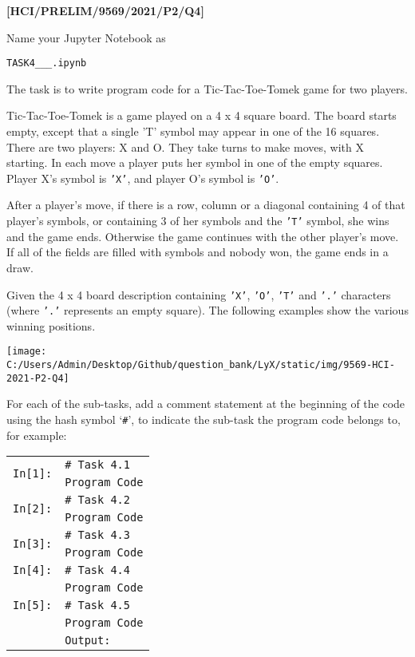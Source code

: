 \item \textbf{{[}HCI/PRELIM/9569/2021/P2/Q4{]}}

Name your Jupyter Notebook as 

\texttt{TASK4\_<your name>\_<centre number>\_<index number>.ipynb }

The task is to write program code for a Tic-Tac-Toe-Tomek game for
two players. 

Tic-Tac-Toe-Tomek is a game played on a 4 x 4 square board. The board
starts empty, except that a single 'T' symbol may appear in one of
the 16 squares. There are two players: X and O. They take turns to
make moves, with X starting. In each move a player puts her symbol
in one of the empty squares. Player X's symbol is \texttt{'X'}, and
player O's symbol is \texttt{'O'}. 

After a player's move, if there is a row, column or a diagonal containing
4 of that player's symbols, or containing 3 of her symbols and the
\texttt{'T'} symbol, she wins and the game ends. Otherwise the game
continues with the other player's move. If all of the fields are filled
with symbols and nobody won, the game ends in a draw. 

Given the 4 x 4 board description containing \texttt{'X'}, \texttt{'O'},
\texttt{'T'} and \texttt{'.'} characters (where \texttt{'.'} represents
an empty square). The following examples show the various winning
positions. 
\begin{center}
\texttt{[image: C:/Users/Admin/Desktop/Github/question\_bank/LyX/static/img/9569-HCI-2021-P2-Q4]}
\par\end{center}

For each of the sub-tasks, add a comment statement at the beginning
of the code using the hash symbol \textquoteleft \texttt{\#}\textquoteright ,
to indicate the sub-task the program code belongs to, for example: 
\noindent \begin{center}
\begin{tabular}{c|l|}
\cline{2-2} 
\multirow{2}{*}{\texttt{In{[}1{]}:}} & \texttt{\# Task 4.1}\tabularnewline
 & \texttt{Program Code}\tabularnewline
\cline{2-2} 
\multirow{2}{*}{\texttt{In{[}2{]}:}} & \texttt{\# Task 4.2}\tabularnewline
 & \texttt{Program Code}\tabularnewline
\cline{2-2} 
\multirow{2}{*}{\texttt{In{[}3{]}:}} & \texttt{\# Task 4.3}\tabularnewline
 & \texttt{Program Code}\tabularnewline
\cline{2-2} 
\texttt{In{[}4{]}:} & \texttt{\# Task 4.4}\tabularnewline
 & \texttt{Program Code}\tabularnewline
\cline{2-2} 
\texttt{In{[}5{]}:} & \texttt{\# Task 4.5}\tabularnewline
 & \texttt{Program Code}\tabularnewline
\cline{2-2} 
\multicolumn{1}{c}{} & \multicolumn{1}{l}{\texttt{Output:}}\tabularnewline
\end{tabular}
\par\end{center}

